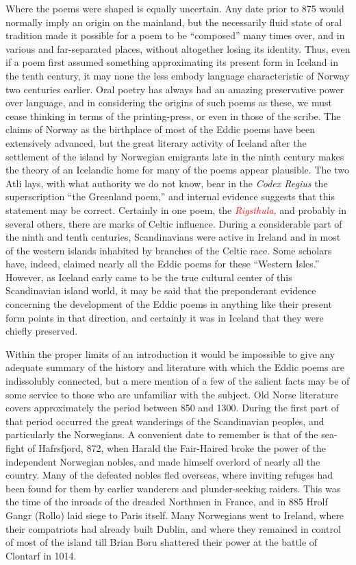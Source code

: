 \documentclass{scrbook}
\newcommand{\chapterref}[1]{\textcolor{red}{\emph{#1}}}
\newcommand{\chapterref}[1]{\hyperref[cha:#1]{\emph{#1}}}
\begin{document}
Where the poems were shaped is equally uncertain. Any date prior to 875 would normally imply an origin on the mainland, but the necessarily fluid state of oral tradition made it possible for a poem to be ``composed'' many times over, and in various and far-separated places, without altogether losing its identity. Thus, even if a poem first assumed something approximating its present form in Iceland in the tenth century, it may none the less embody language characteristic of Norway two centuries earlier. Oral poetry has always had an amazing preservative power over language, and in considering the origins of such poems as these, we must cease thinking in terms of the printing-press, or even in those of the scribe. The claims of Norway as the birthplace of most of the Eddic poems have been extensively advanced, but the great literary activity of Iceland after the settlement of the island by Norwegian emigrants late in the ninth century makes the theory of an Icelandic home for many of the poems appear plausible. The two Atli lays, with what authority we do not know, bear in the \emph{Codex Regius} the superscription ``the Greenland poem,'' and internal evidence suggests that this statement may be correct. Certainly in one poem, the \chapterref{Rigsthula,} and probably in several others, there are marks of Celtic influence. During a considerable part of the ninth and tenth centuries, Scandinavians were active in Ireland and in most of the western islands inhabited by branches of the Celtic race. Some scholars have, indeed, claimed nearly all the Eddic poems for these ``Western Isles.'' However, as Iceland early came to be the true cultural center of this Scandinavian island world, it may be said that the preponderant evidence concerning the development of the Eddic poems in anything like their present form points in that direction, and certainly it was in Iceland that they were chiefly preserved.


Within the proper limits of an introduction it would be impossible to give any adequate summary of the history and literature with which the Eddic poems are indissolubly connected, but a mere mention of a few of the salient facts may be of some service to those who are unfamiliar with the subject. Old Norse literature covers approximately the period between 850 and 1300. During the first part of that period occurred the great wanderings of the Scandinavian peoples, and particularly the Norwegians. A convenient date to remember is that of the sea-fight of Hafrsfjord, 872, when Harald the Fair-Haired broke the power of the independent Norwegian nobles, and made himself overlord of nearly all the country. Many of the defeated nobles fled overseas, where inviting refuges had been found for them by earlier wanderers and plunder-seeking raiders. This was the time of the inroads of the dreaded Northmen in France, and in 885 Hrolf Gangr (Rollo) laid siege to Paris itself. Many Norwegians went to Ireland, where their compatriots had already built Dublin, and where they remained in control of most of the island till Brian Boru shattered their power at the battle of Clontarf in 1014.
\end{document}
